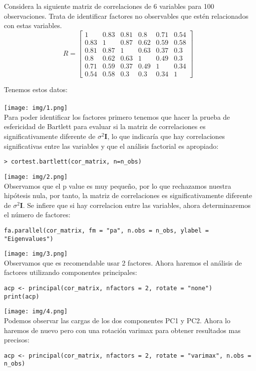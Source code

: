\begin{problem}{1}
Considera la siguiente matriz de correlaciones de 6 variables para 100 observaciones. Trata de identificar factores no observables que estén relacionados con estas variables.
\[
R =
\begin{bmatrix}
1    & 0.83 & 0.81 & 0.8  & 0.71 & 0.54 \\
0.83 & 1    & 0.87 & 0.62 & 0.59 & 0.58 \\
0.81 & 0.87 & 1    & 0.63 & 0.37 & 0.3  \\
0.8  & 0.62 & 0.63 & 1    & 0.49 & 0.3  \\
0.71 & 0.59 & 0.37 & 0.49 & 1    & 0.34 \\
0.54 & 0.58 & 0.3  & 0.3  & 0.34 & 1    
\end{bmatrix}
\]
\end{problem}
\begin{sol}
Tenemos estos datos:\\\\
\texttt{[image: img/1.png]}\\
Para poder identificar los factores primero tenemos que hacer la prueba de esfericidad de Bartlett para evaluar si la matriz de correlaciones es significativamente diferente de $\sigma^2 \bm{I}$, lo que indicaría que hay correlaciones significativas entre las variables y que el análisis factorial es apropiado:
\begin{verbatim}
> cortest.bartlett(cor_matrix, n=n_obs)
\end{verbatim}
\texttt{[image: img/2.png]}\\
Observamos que el p value es muy pequeño, por lo que rechazamos nuestra hipótesis nula, por tanto, la matriz de correlaciones es significativamente diferente de $\sigma^2 \bm{I}$. Se infiere que si hay correlacion entre las variables, ahora determinaremos el número de factores:
\begin{verbatim}
fa.parallel(cor_matrix, fm = "pa", n.obs = n_obs, ylabel = "Eigenvalues")
\end{verbatim}
\texttt{[image: img/3.png]}\\
Observamos que es recomendable usar 2 factores. Ahora haremos el análisis de factores utilizando componentes principales:
\begin{verbatim}
acp <- principal(cor_matrix, nfactors = 2, rotate = "none")
print(acp)
\end{verbatim}
\texttt{[image: img/4.png]}\\
Podemos observar las cargas de los dos componentes PC1 y PC2. Ahora lo haremos de nuevo pero con una rotación varimax para obtener resultados mas precisos:
\begin{verbatim}
acp <- principal(cor_matrix, nfactors = 2, rotate = "varimax", n.obs = n_obs)


\end{verbatim}
\end{sol}
